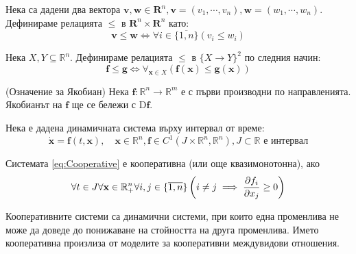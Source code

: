 \begin{definition}
  Нека са дадени два вектора $\mathbf{v}, \mathbf{w} \in \mathbf{R}^n, \mathbf{v}=(v_1, \cdots, v_n), \mathbf{w}=(w_1, \cdots, w_n)$. Дефинираме релацията $\leq$ в $\mathbf{R}^n \times \mathbf{R}^n$ като:
  \begin{equation*}
    \mathbf{v} \leq \mathbf{w} \iff \forall{i \in \{\overline{1,n}\}}(v_i \leq w_i)
  \end{equation*}
\end{definition}

\begin{definition}
  \label{def:FunctionLEQ}
  Нека $X, Y \subseteq \mathbb{R}^n$. Дефинираме релацията $\leq$ в $\{X \rightarrow Y\}^2$ по следния начин:
  \begin{equation*}
    \mathbf{f} \leq \mathbf{g} \iff \forall_{\mathbf{x} \in X} (\mathbf{f}(\mathbf{x}) \leq \mathbf{g}(\mathbf{x}))
  \end{equation*}
\end{definition}

\begin{definition}(Означение за Якобиан)
  Нека $\mathbf{f}: \mathbb{R}^n \rightarrow \mathbb{R}^m$ е с първи производни по направленията.
  Якобианът на $\mathbf{f}$ ще се бележи с $\mathrm{D} \mathbf{f}$.
\end{definition}

Нека е дадена динамичната система върху интервал от време:
\begin{equation}
  \label{eq:Cooperative}
  \dot{\mathbf{x}} = \mathbf{f}(t, \mathbf{x}),  \quad \mathbf{x} \in \mathbb{R}^n, \mathbf{f} \in C^1(J \times \mathbb{R}^n, \mathbb{R}^n), J \subset \mathbb{R} \text{ е интервал}
\end{equation}

\begin{definition}
  \label{def:Cooperative}
  Системата \eqref{eq:Cooperative} е кооперативна (или още квазимонотонна), ако
  \begin{equation}
    \forall{t \in J}\forall{\mathbf{x} \in \mathbb{R}_{+}^n}\forall{i,j \in \{\overline{1,n}\}}\left(i \neq j \implies \pdv{f_i}{x_j}(t, \mathbf{x}) \geq 0\right)
  \end{equation}
\end{definition}
Кооперативните системи са динамични системи, при които една променлива не може да доведе до понижаване на стойността на друга променлива. Името кооперативна произлиза от моделите за кооперативни междувидови отношения.

